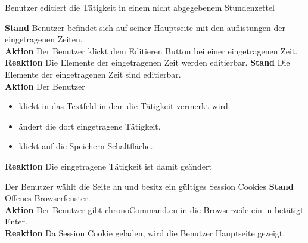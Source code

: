 \begin{requirements}
	 Benutzer editiert die Tätigkeit in einem nicht abgegebenem Stundenzettel
	\begin{requirements}
	        \textbf{Stand} Benutzer befindet sich auf seiner Hauptseite mit den auflistungen der eingetragenen Zeiten. \\
	        \textbf{Aktion} Der Benutzer klickt dem Editieren Button bei einer eingetragenen Zeit.\\
            \textbf{Reaktion} Die Elemente der eingetragenen Zeit werden editierbar.
        \textbf{Stand} Die Elemente der eingetragenen Zeit sind editierbar.\\
        \textbf{Aktion} Der Benutzer
            \begin{itemize}
                \item klickt in das Textfeld in dem die Tätigkeit vermerkt wird.
                \item ändert die dort eingetragene Tätigkeit.
                \item klickt auf die Speichern Schaltfläche.
            \end{itemize}
            \textbf{Reaktion} Die eingetragene Tätigkeit ist damit geändert
    \end{requirements}

     Der Benutzer wählt die Seite an und besitz ein gültiges Session Cookies
        \textbf{Stand} Offenes Browserfenster. \\
        \textbf{Aktion} Der Benutzer gibt chronoCommand.eu in die Browserzeile ein in betätigt Enter. \\
        \textbf{Reaktion} Da Session Cookie geladen, wird die Benutzer Hauptseite gezeigt.

\end{requirements}

